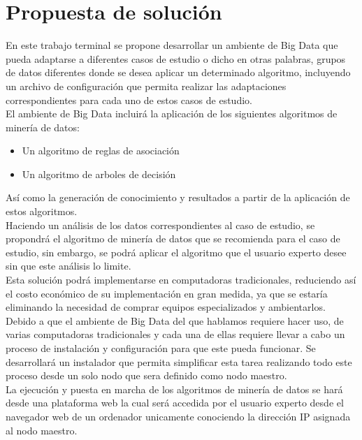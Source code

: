 \section{Propuesta de solución}
En este trabajo terminal se propone desarrollar un ambiente de Big Data que pueda adaptarse a diferentes casos de estudio o dicho en otras palabras, grupos de datos diferentes donde se desea aplicar un determinado algoritmo, incluyendo un archivo de configuración que permita realizar las adaptaciones correspondientes para cada uno de estos casos de estudio.
\\
El ambiente de Big Data incluirá la aplicación de los siguientes algoritmos de minería de datos: \\
\begin{itemize}
	\item Un algoritmo de reglas de asociación \\
	\item Un algoritmo de arboles de decisión \\
\end{itemize}
Así como la generación de conocimiento y resultados a partir de la aplicación de estos algoritmos.
\\
Haciendo un análisis de los datos correspondientes al caso de estudio, se propondrá el algoritmo de minería de datos que se recomienda para el caso de estudio, sin embargo, se podrá aplicar el algoritmo que el usuario experto desee sin que este análisis lo limite.
\\
Esta solución podrá implementarse en computadoras tradicionales, reduciendo así el costo económico de su implementación en gran medida, ya que se estaría eliminando la necesidad de comprar equipos especializados y ambientarlos.
\\
Debido a que el ambiente de Big Data del que hablamos requiere hacer uso, de varias computadoras tradicionales y cada una de ellas requiere llevar a cabo un proceso de instalación y configuración para que este pueda funcionar. Se desarrollará un instalador que permita simplificar esta tarea realizando todo este proceso desde un solo nodo que sera definido como nodo maestro.  
\\
La ejecución y puesta en marcha de los algoritmos de minería de datos se hará desde una plataforma web la cual será accedida por el usuario experto desde el navegador web de un ordenador unicamente conociendo la dirección IP asignada al nodo maestro.
\\